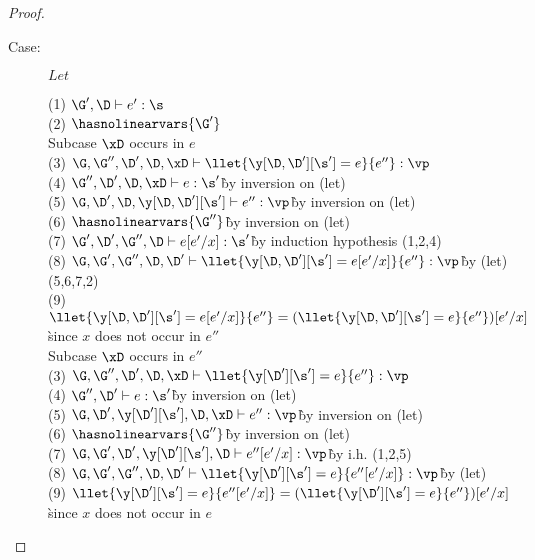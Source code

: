 \begin{proof}
\begin{description}
\item[Case:] $Let$
\begin{tabbing}
    (1) $\G',\D \vdash e' : \s$\\
    (2) $\hasnolinearvars{\G'}$\\
    Subcase $\xD$ occurs in $e$\\
    (3) $\G, \G'', \D', \D, \xD \vdash \llet{\y[\D,\D'][\s'] = e}{e''} : \vp$\\
    (4) $\G'',\D', \D, \xD \vdash e : \s'$\` by inversion on (let)\\
    (5) $\G,\D',\D,\y[\D,\D'][\s'] \vdash e'' : \vp$\` by inversion on (let)\\
    (6) $\hasnolinearvars{\G''}$\` by inversion on (let)\\
    (7) $\G',\D',\G'',\D \vdash e[e'/x] : \s'$\` by induction hypothesis (1,2,4)\\
    (8) $\G,\G',\G'',\D,\D' \vdash \llet{\y[\D,\D'][\s'] = e[e'/x]}{e''} : \vp$\` by (let) (5,6,7,2)\\
    (9) $\llet{\y[\D,\D'][\s'] = e[e'/x]}{e''} = (\llet{\y[\D,\D'][\s'] = e}{e''})[e'/x]$\` since $x$ does not occur in $e''$\\
    Subcase $\xD$ occurs in $e''$\\
    (3) $\G, \G'', \D', \D, \xD \vdash \llet{\y[\D'][\s'] = e}{e''} : \vp$\\
    (4) $\G'',\D' \vdash e : \s'$\` by inversion on (let)\\
    (5) $\G,\D',\y[\D'][\s'],\D,\xD \vdash e'' : \vp$\` by inversion on (let)\\
    (6) $\hasnolinearvars{\G''}$\` by inversion on (let)\\
    (7) $\G,\G',\D',\y[\D'][\s'],\D \vdash e''[e'/x] : \vp$\` by i.h. (1,2,5)\\
    (8) $\G,\G',\G'',\D,\D' \vdash \llet{\y[\D'][\s'] = e}{e''[e'/x]} : \vp$\` by (let)\\
    (9) $\llet{\y[\D'][\s'] = e}{e''[e'/x]} = (\llet{\y[\D'][\s'] = e}{e''})[e'/x]$\` since $x$ does not occur in $e$\\
\end{tabbing}


\end{description}
\end{proof}
